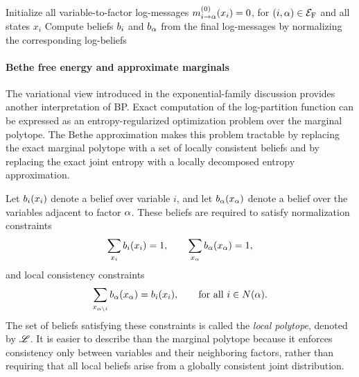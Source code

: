 \begin{algorithm}[htbp]
    \caption{Sum--product Belief Propagation}
    \label{alg:sum_product_bp}
    Initialize all variable-to-factor log-messages $m_{i\to \alpha}^{(0)}(x_i)=0$, for $(i,\alpha)\in\mathcal{E}_{\mathrm{F}}$ and all states $x_i$\;
    Compute beliefs $b_i$ and $b_{\alpha}$ from the final log-messages by normalizing the corresponding log-beliefs\;
\end{algorithm}

\paragraph{Bethe free energy and approximate marginals}
The variational view introduced in the exponential-family discussion provides another interpretation of BP. Exact computation of the log-partition function can be expressed as an entropy-regularized optimization problem over the marginal polytope. The Bethe approximation makes this problem tractable by replacing the exact marginal polytope with a set of locally consistent beliefs and by replacing the exact joint entropy with a locally decomposed entropy approximation.

Let $b_i(x_i)$ denote a belief over variable $i$, and let $b_{\alpha}(x_{\alpha})$ denote a belief over the variables adjacent to factor $\alpha$. These beliefs are required to satisfy normalization constraints
\begin{equation}
    \sum_{x_i} b_i(x_i) = 1, \qquad \sum_{x_{\alpha}} b_{\alpha}(x_{\alpha}) = 1,
\end{equation}
and local consistency constraints
\begin{equation}
    \sum_{x_{\alpha\setminus i}} b_{\alpha}(x_{\alpha}) = b_i(x_i), \qquad \text{for all } i\in N(\alpha).
\end{equation}
The set of beliefs satisfying these constraints is called the \emph{local polytope}, denoted by $\mathscr{L}$. It is easier to describe than the marginal polytope because it enforces consistency only between variables and their neighboring factors, rather than requiring that all local beliefs arise from a globally consistent joint distribution.

